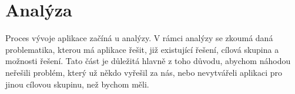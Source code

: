 \chapter{Analýza}
\label{ch:analysis}
Proces vývoje aplikace začíná u analýzy. V rámci analýzy se zkoumá daná problematika, kterou má aplikace řešit, již existující řešení, cílová skupina a možnosti řešení. Tato část je důležitá hlavně z toho důvodu, abychom náhodou neřešili problém, který už někdo vyřešil za nás, nebo nevytvářeli aplikaci pro jinou cílovou skupinu, než bychom měli.








